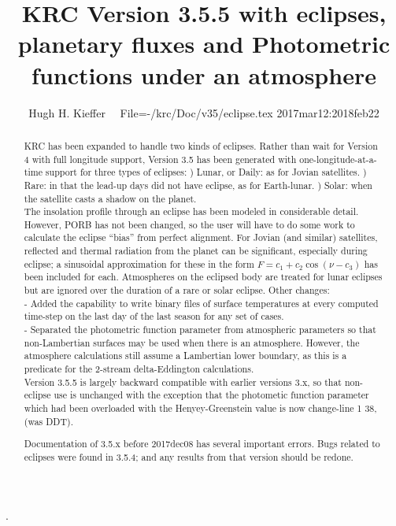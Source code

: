 \documentclass{article}
\title{KRC Version 3.5.5 with eclipses, planetary fluxes and Photometric functions under an atmosphere}
\author{Hugh H. Kieffer  \ \ File=-/krc/Doc/v35/eclipse.tex  2017mar12:2018feb22}
\begin{document}
\maketitle
\tableofcontents
\listoffigures
\hrulefill .\hrulefill

\begin{abstract}

KRC has been expanded to handle two kinds of eclipses. Rather than wait for
Version 4 with full longitude support, Version 3.5 has been generated with
one-longitude-at-a-time support for three types of eclipses:
) Lunar, or Daily: as for Jovian satellites.
) Rare: in that the lead-up days did not have eclipse, as for Earth-lunar. 
) Solar: when the satellite casts a shadow on the planet.
\\ The insolation profile through an eclipse has been modeled in considerable
detail. However, PORB has not been changed, so the user will have to do some
work to calculate the eclipse ``bias'' from perfect alignment. 
For Jovian (and similar) satellites, reflected and thermal radiation from the
planet can be significant, especially during eclipse; a sinusoidal approximation
for these in the form $F=c_1 + c_2 \cos (\nu -c_3)$ has been included for each. 
Atmospheres on the eclipsed body are treated for lunar eclipses but are ignored over the duration of a rare or solar eclipse. Other changes:
\\ - Added the capability to write binary files of surface temperatures at every
computed time-step on the last day of the last season for any set of cases.
\\ - Separated the photometric function parameter from atmospheric parameters so
that non-Lambertian surfaces may be used when there is an atmosphere. However,
the atmosphere calculations still assume a Lambertian lower boundary, as this is
a predicate for the 2-stream delta-Eddington calculations.
\\ Version 3.5.5 is largely backward compatible with earlier versions 3.x, so that
non-eclipse use is unchanged with the exception that the photometic function
parameter which had been overloaded with the Henyey-Greenstein value is now
change-line 1 38, (was DDT).

Documentation of 3.5.x before 2017dec08 has several important errors. Bugs related to eclipses were found in 3.5.4; and any results from that version should be redone. 

\end{abstract}
\end{document}
